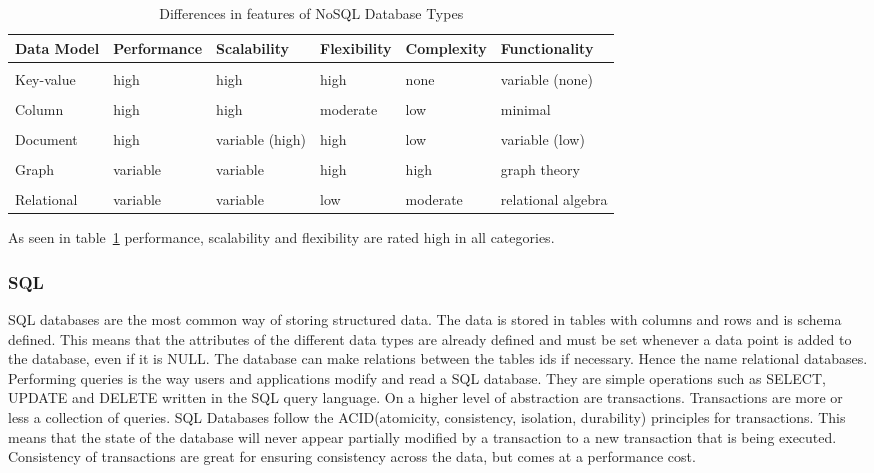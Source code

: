 \begin{table}[H]
\centering
\begin{adjustwidth}{-2cm}{}
\begin{tabularx}{1.3\textwidth}{  l l l l l l }
  \textbf{Data Model} & \textbf{Performance} & \textbf{Scalability} & \textbf{Flexibility} & \textbf{Complexity} & \textbf{Functionality}\\
  \hline \\ [-1.5ex]
  Key-value & high      & high              & high      & none      & variable (none)\\
  \hline \\ [-1.5ex]
  Column    & high      & high              & moderate  & low       & minimal \\
  \hline \\ [-1.5ex]
  Document  & high      & variable (high)   & high      & low       & variable (low)\\
  \hline \\ [-1.5ex]
  Graph     & variable  & variable          & high      & high      & graph theory \\
  \hline \\ [-1.5ex]
  Relational & variable & variable          & low       & moderate  & relational algebra\\
\end{tabularx}
\end{adjustwidth}
\caption{Differences in features of NoSQL Database Types}
\label{table:nosql-calssifications}
\end{table}
As seen in table~\ref{table:nosql-calssifications} performance, scalability and flexibility are rated high in all categories.
\cite{nosql-databases, nosql-article}


\subsubsection*{SQL}
SQL databases are the most common way of storing structured data. The data is stored in tables with columns and rows and is schema defined. This means that the attributes of the different data types are already defined and must be set whenever a data point is added to the database, even if it is NULL. The database can make relations between the tables ids if necessary. Hence the name relational databases.
Performing queries is the way users and applications modify and read a SQL database. They are simple operations such as SELECT, UPDATE and DELETE written in the SQL query language. On a higher level of abstraction are transactions. Transactions are more or less a collection of queries. SQL Databases follow the ACID(atomicity, consistency, isolation, durability) principles for transactions. This means that the state of the database will never appear partially modified by a transaction to a new transaction that is being executed. Consistency of transactions are great for ensuring consistency across the data, but comes at a performance cost.
\cite{ramakrishnan2003database}

